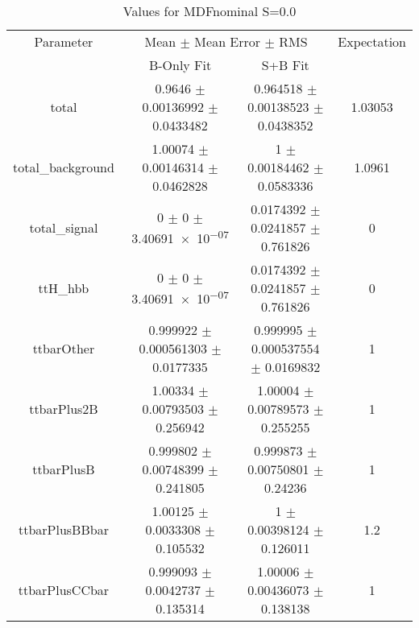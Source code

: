 \begin{table}
\centering
\caption{Values for MDFnominal S=0.0}
\begin{tabular}{cccc}
\toprule
Parameter & \multicolumn{2}{c}{Mean $\pm$ Mean Error $\pm$ RMS} & Expectation\\
 & B-Only Fit & S+B Fit & \\
\midrule
total & \num{0.9646} $\pm$ \num{0.00136992} $\pm$ \num{0.0433482} & \num{0.964518} $\pm$ \num{0.00138523} $\pm$ \num{0.0438352} & \num{1.03053}\\
total\_background & \num{1.00074} $\pm$ \num{0.00146314} $\pm$ \num{0.0462828} & \num{1} $\pm$ \num{0.00184462} $\pm$ \num{0.0583336} & \num{1.0961}\\
total\_signal & \num{0} $\pm$ \num{0} $\pm$ \num{3.40691e-07} & \num{0.0174392} $\pm$ \num{0.0241857} $\pm$ \num{0.761826} & \num{0}\\
ttH\_hbb & \num{0} $\pm$ \num{0} $\pm$ \num{3.40691e-07} & \num{0.0174392} $\pm$ \num{0.0241857} $\pm$ \num{0.761826} & \num{0}\\
ttbarOther & \num{0.999922} $\pm$ \num{0.000561303} $\pm$ \num{0.0177335} & \num{0.999995} $\pm$ \num{0.000537554} $\pm$ \num{0.0169832} & \num{1}\\
ttbarPlus2B & \num{1.00334} $\pm$ \num{0.00793503} $\pm$ \num{0.256942} & \num{1.00004} $\pm$ \num{0.00789573} $\pm$ \num{0.255255} & \num{1}\\
ttbarPlusB & \num{0.999802} $\pm$ \num{0.00748399} $\pm$ \num{0.241805} & \num{0.999873} $\pm$ \num{0.00750801} $\pm$ \num{0.24236} & \num{1}\\
ttbarPlusBBbar & \num{1.00125} $\pm$ \num{0.0033308} $\pm$ \num{0.105532} & \num{1} $\pm$ \num{0.00398124} $\pm$ \num{0.126011} & \num{1.2}\\
ttbarPlusCCbar & \num{0.999093} $\pm$ \num{0.0042737} $\pm$ \num{0.135314} & \num{1.00006} $\pm$ \num{0.00436073} $\pm$ \num{0.138138} & \num{1}\\
\bottomrule
\end{tabular}
\end{table}